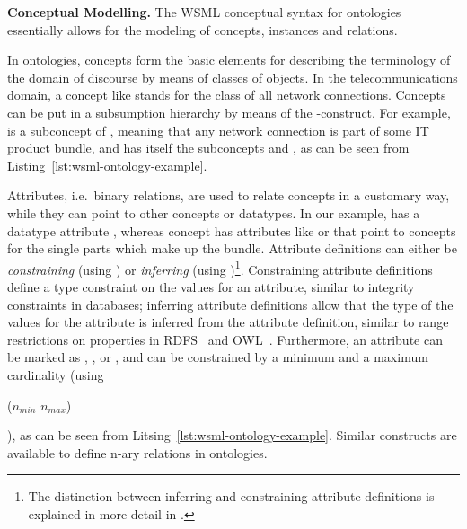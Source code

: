 {\bfseries Conceptual Modelling.} The WSML conceptual syntax for
ontologies essentially allows for the modeling of concepts,
instances and relations.

In ontologies, concepts form the basic elements for describing the
terminology of the domain of discourse by means of classes of
objects. In the telecommunications domain, a concept like
 stands for the class of all network
connections. Concepts can be put in a subsumption hierarchy by
means of the -construct. For example,
 is a subconcept of
, meaning that any network connection is part
of some IT product bundle, and has itself the subconcepts
 and , as can be
seen from Listing~\ref{lst:wsml-ontology-example}.

Attributes, i.e.\ binary relations, are used to relate concepts in a
customary way, while they can point to other concepts or datatypes.
In our example,  has a datatype attribute
, whereas concept 
has attributes like  or
 that point to concepts for the single
parts which make up the bundle. Attribute definitions can either be
\emph{constraining} (using ) or \emph{inferring} (using
)\footnote{The distinction
  between inferring and constraining attribute definitions is
  explained in more detail in \cite[Section
  2]{debr-etal-2005c}.}. Constraining attribute definitions
define a type constraint on the values for an attribute, similar
to integrity constraints in databases; inferring attribute
definitions allow that the type of the values for the attribute is
inferred from the attribute definition, similar to range
restrictions on properties in
RDFS~\cite{Brickley+Guha-VocaDescLang:03} and
OWL~\cite{Dean+Schreiber-OntoLangRefe:04}. Furthermore, an
attribute can be marked as , , or
, and can be constrained by a minimum and a
maximum cardinality (using \begin{footnotesize}\textsf{($n_{min}$
$n_{max}$)}\end{footnotesize}), as can be seen from
Litsing~\ref{lst:wsml-ontology-example}. Similar constructs are
available to define n-ary relations in ontologies.

